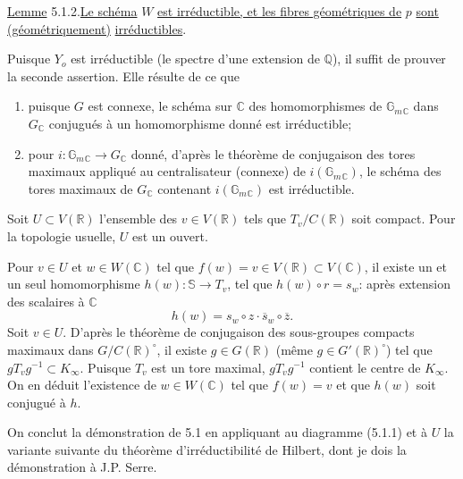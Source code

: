 \documentclass[10pt]{article}
\newcommand{\C}{\mathbb C}
\newcommand{\Gm}{\mathbb G_m}
\newcommand{\Q}{\mathbb Q}
\newcommand{\R}{\mathbb R}
\newcommand{\bS}{\mathbb S}
\begin{document}
\noindent \uline{Lemme} 5.1.2.\quad \uline{Le schéma} $W$ \uline{est irréductible, et les fibres géométriques de} $p$ \uline{sont} \uline{(géométriquement)} \uline{irréductibles}.

Puisque $Y_o$ est irréductible (le spectre d'une extension de $\Q$), il suffit de prouver la seconde assertion. Elle résulte de ce que
\begin{enumerate}[label=(\alph*)]
\item puisque $G$ est connexe, le schéma sur $\C$ des homomorphismes de $\Gm{}_{\C}$ dans $G_{\C}$ conjugués à un homomorphisme donné est irréductible;
\item pour $i:\Gm{}_{\C}\to G_{\C}$ donné, d'après le théorème de conjugaison des tores maximaux appliqué au centralisateur (connexe) de $i(\Gm{}_{\C})$, le schéma des tores maximaux de $G_{\C}$ contenant $i(\Gm{}_{\C})$ est irréductible.
\end{enumerate}

Soit $U\subset V(\R)$ l'ensemble des $v\in V(\R)$ tels que $T_v/C(\R)$ soit compact. Pour la topologie usuelle, $U$ est un ouvert.

Pour $v\in U$ et $w\in W(\C)$ tel que $f(w)=v\in V(\R)\subset V(\C)$, il existe un et un seul homomorphisme $h(w):\bS\longrightarrow T_v$, tel que $h(w)\circ r=s_w$: après extension des scalaires à $\C$
\[
h(w)=s_w\circ z\cdot \overline{s}_w\circ\overline z.
\]
Soit $v\in U$. D'après le théorème de conjugaison des sous-groupes compacts maximaux dans $G/C(\R)^\circ$, il existe $g\in G(\R)$ (même $g\in G'(\R)^\circ$) tel que $gT_vg^{-1}\subset K_\infty$.
Puisque $T_v$ est un tore maximal, $gT_vg^{-1}$ contient le centre de $K_\infty$. On en déduit l'existence de $w\in W(\C)$ tel que $f(w)=v$ et que $h(w)$ soit conjugué à $h$.

On conclut la démonstration de 5.1 en appliquant au diagramme (5.1.1) et à $U$ la variante suivante du théorème d'irréductibilité de Hilbert, dont je dois la démonstration à J.P. Serre.
\end{document}
